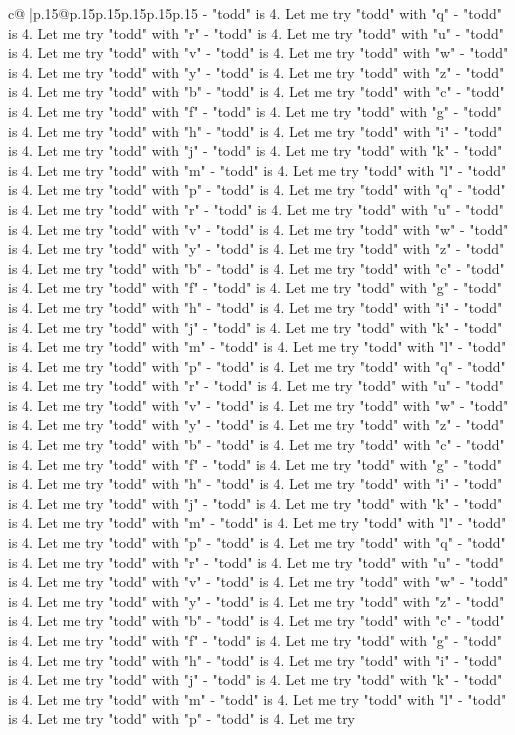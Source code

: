 \documentclass{article}
\begin{document}
{\begin{supertabular}{c@{$\;$}|p{.15\linewidth}@{}p{.15\linewidth}p{.15\linewidth}p{.15\linewidth}p{.15\linewidth}p{.15\linewidth}}
{{{{-} "todd" is 4. Let me try "todd" with "q" {-} "todd" is 4. Let me try "todd" with "r" {-} "todd" is 4. Let me try "todd" with "u" {-} "todd" is 4. Let me try "todd" with "v" {-} "todd" is 4. Let me try "todd" with "w" {-} "todd" is 4. Let me try "todd" with "y" {-} "todd" is 4. Let me try "todd" with "z" {-} "todd" is 4. Let me try "todd" with "b" {-} "todd" is 4. Let me try "todd" with "c" {-} "todd" is 4. Let me try "todd" with "f" {-} "todd" is 4. Let me try "todd" with "g" {-} "todd" is 4. Let me try "todd" with "h" {-} "todd" is 4. Let me try "todd" with "i" {-} "todd" is 4. Let me try "todd" with "j" {-} "todd" is 4. Let me try "todd" with "k" {-} "todd" is 4. Let me try "todd" with "m" {-} "todd" is 4. Let me try "todd" with "l" {-} "todd" is 4. Let me try "todd" with "p" {-} "todd" is 4. Let me try "todd" with "q" {-} "todd" is 4. Let me try "todd" with "r" {-} "todd" is 4. Let me try "todd" with "u" {-} "todd" is 4. Let me try "todd" with "v" {-} "todd" is 4. Let me try "todd" with "w" {-} "todd" is 4. Let me try "todd" with "y" {-} "todd" is 4. Let me try "todd" with "z" {-} "todd" is 4. Let me try "todd" with "b" {-} "todd" is 4. Let me try "todd" with "c" {-} "todd" is 4. Let me try "todd" with "f" {-} "todd" is 4. Let me try "todd" with "g" {-} "todd" is 4. Let me try "todd" with "h" {-} "todd" is 4. Let me try "todd" with "i" {-} "todd" is 4. Let me try "todd" with "j" {-} "todd" is 4. Let me try "todd" with "k" {-} "todd" is 4. Let me try "todd" with "m" {-} "todd" is 4. Let me try "todd" with "l" {-} "todd" is 4. Let me try "todd" with "p" {-} "todd" is 4. Let me try "todd" with "q" {-} "todd" is 4. Let me try "todd" with "r" {-} "todd" is 4. Let me try "todd" with "u" {-} "todd" is 4. Let me try "todd" with "v" {-} "todd" is 4. Let me try "todd" with "w" {-} "todd" is 4. Let me try "todd" with "y" {-} "todd" is 4. Let me try "todd" with "z" {-} "todd" is 4. Let me try "todd" with "b" {-} "todd" is 4. Let me try "todd" with "c" {-} "todd" is 4. Let me try "todd" with "f" {-} "todd" is 4. Let me try "todd" with "g" {-} "todd" is 4. Let me try "todd" with "h" {-} "todd" is 4. Let me try "todd" with "i" {-} "todd" is 4. Let me try "todd" with "j" {-} "todd" is 4. Let me try "todd" with "k" {-} "todd" is 4. Let me try "todd" with "m" {-} "todd" is 4. Let me try "todd" with "l" {-} "todd" is 4. Let me try "todd" with "p" {-} "todd" is 4. Let me try "todd" with "q" {-} "todd" is 4. Let me try "todd" with "r" {-} "todd" is 4. Let me try "todd" with "u" {-} "todd" is 4. Let me try "todd" with "v" {-} "todd" is 4. Let me try "todd" with "w" {-} "todd" is 4. Let me try "todd" with "y" {-} "todd" is 4. Let me try "todd" with "z" {-} "todd" is 4. Let me try "todd" with "b" {-} "todd" is 4. Let me try "todd" with "c" {-} "todd" is 4. Let me try "todd" with "f" {-} "todd" is 4. Let me try "todd" with "g" {-} "todd" is 4. Let me try "todd" with "h" {-} "todd" is 4. Let me try "todd" with "i" {-} "todd" is 4. Let me try "todd" with "j" {-} "todd" is 4. Let me try "todd" with "k" {-} "todd" is 4. Let me try "todd" with "m" {-} "todd" is 4. Let me try "todd" with "l" {-} "todd" is 4. Let me try "todd" with "p" {-} "todd" is 4. Let me try }}}
\end{supertabular}}
\end{document}
